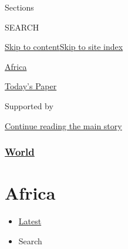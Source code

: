 Sections

SEARCH

\protect\hyperlink{site-content}{Skip to
content}\protect\hyperlink{site-index}{Skip to site index}

\href{https://www.nytimes.com/section/world/africa}{Africa}

\href{https://myaccount.nytimes.com/auth/login?response_type=cookie\&client_id=vi}{}

\href{https://www.nytimes.com/section/todayspaper}{Today's Paper}

Supported by

\protect\hyperlink{after-sponsor}{Continue reading the main story}

\hypertarget{world}{%
\subsubsection{\texorpdfstring{\href{/section/world}{World}}{World}}\label{world}}

\hypertarget{africa}{%
\section{Africa}\label{africa}}

\begin{itemize}
\tightlist
\item
  \protect\hyperlink{stream-panel}{Latest}
\item
  Search
\end{itemize}

